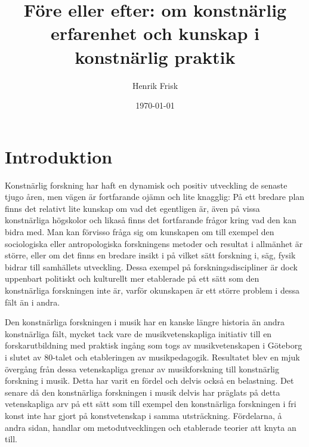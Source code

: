 \documentclass[11pt]{article}
\author{Henrik Frisk}
\date{\today}
\title{Före eller efter: om konstnärlig erfarenhet och kunskap i konstnärlig praktik}
\begin{document}
\maketitle

\section*{Introduktion}
\label{sec:orge80880a}
Konstnärlig forskning har haft en dynamisk och positiv utveckling de
senaste tjugo åren, men vägen är fortfarande ojämn och lite knagglig:
På ett bredare plan finns det relativt lite kunskap om vad det egentligen är,
även på vissa konstnärliga högskolor och likaså finns det fortfarande
frågor kring vad den kan bidra med. Man kan förvisso fråga sig om
kunskapen om till exempel den sociologiska eller antropologiska forskningens
metoder och resultat i allmänhet är större, eller om det finns en
bredare insikt i på vilket sätt forskning i, säg, fysik bidrar till
samhällets utveckling. Dessa exempel på forskningsdiscipliner är dock uppenbart politiskt och kulturellt mer etablerade på ett sätt som den konstnärliga forskningen inte är, varför okunskapen är ett större problem i dessa fält än i andra. 

Den konstnärliga forskningen i musik har en kanske längre historia än
andra konstnärliga fält, mycket tack vare de musikvetenskapliga
initiativ till en forskarutbildning med praktisk ingång som togs av
musikvetenskapen i Göteborg i slutet av 80-talet och etableringen av
musikpedagogik. Resultatet blev en mjuk övergång från dessa
vetenskapliga grenar av musikforskning till konstnärlig forskning i
musik. Detta har varit en fördel och delvis också en belastning. Det
senare då den konstnärliga forskningen i musik delvis har präglats på
detta vetenskapliga arv på ett sätt som till exempel den konstnärliga
forskningen i fri konst inte har gjort på konstvetenskap i samma
utsträckning. Fördelarna, å andra sidan, handlar om metodutvecklingen
och etablerade teorier att knyta an till.
\end{document}
